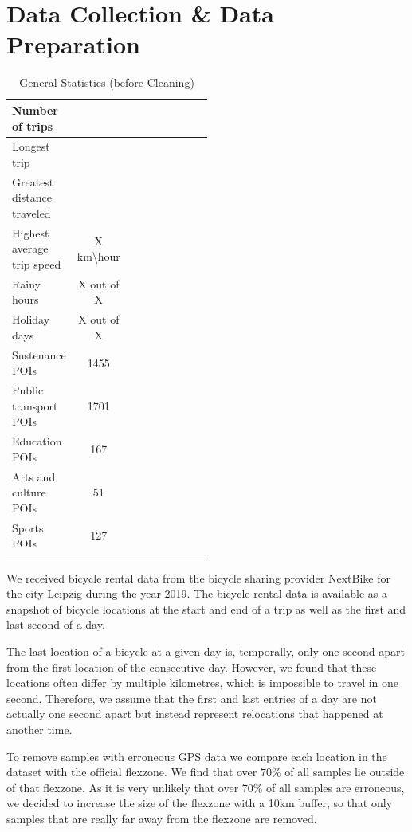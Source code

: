 \section{Data Collection \& Data Preparation}
\label{sec:data_collection_and_data_preparation}

\begin{longtable}{|l|c|p{0.5\linewidth}|c|}
\hline
    Number of trips &  \\
    \hline
    Longest trip &  \\
    \hline
    Greatest distance traveled & \\
    \hline
    Highest average trip speed & X km\textbackslash hour \\
    \hline
    Rainy hours & X out of X \\
    \hline
    Holiday days & X out of X \\
    \hline
    Sustenance POIs & 1455 \\
    \hline
    Public transport POIs & 1701 \\
    \hline
    Education POIs & 167 \\
    \hline
    Arts and culture POIs & 51 \\
    \hline
    Sports POIs & 127 \\
    \hline
  \caption{General Statistics (before Cleaning)}
  \label{table:general_statistics}
\end{longtable}

We received bicycle rental data from the bicycle sharing provider NextBike for the city Leipzig during the year 2019. 
The bicycle rental data is available as a snapshot of bicycle locations at the start and end of a trip as well as the first and last second of a day. 

The last location of a bicycle at a given day is, temporally, only one second apart from the first location of the consecutive day.
However, we found that these locations often differ by multiple kilometres, which is impossible to travel in one second.
Therefore, we assume that the first and last entries of a day are not actually one second apart but instead represent relocations that happened at another time. 

To remove samples with erroneous GPS data we compare each location in the dataset with the official flexzone. 
We find that over \(70\%\) of all samples lie outside of that flexzone.
As it is very unlikely that over 70\% of all samples are erroneous, we decided to increase the size of the flexzone with a 10km buffer, so that only samples that are really far away from the flexzone are removed.

